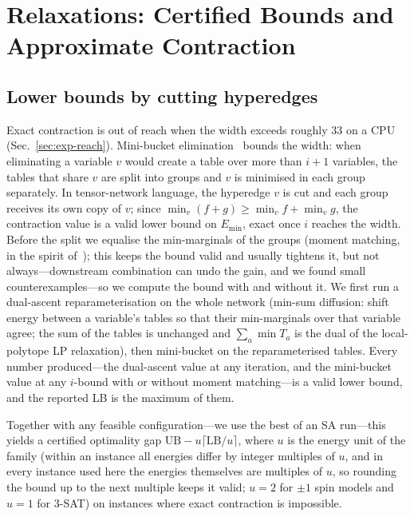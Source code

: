 \documentclass{article}
\newcommand{\Emin}{E_{\min}}
\begin{document}
\section{Relaxations: Certified Bounds and Approximate Contraction}
\label{sec:bounds}

\subsection{Lower bounds by cutting hyperedges}
Exact contraction is out of reach when the width exceeds roughly 33 on a CPU (Sec.~\ref{sec:exp-reach}). Mini-bucket elimination~\cite{dechter2003minibuckets} bounds the width: when eliminating a variable $v$ would create a table over more than $i+1$ variables, the tables that share $v$ are split into groups and $v$ is minimised in each group separately. In tensor-network language, the hyperedge $v$ is cut and each group receives its own copy of $v$; since $\min_v(f+g)\ge\min_v f+\min_v g$, the contraction value is a valid lower bound on $\Emin$, exact once $i$ reaches the width. Before the split we equalise the min-marginals of the groups (moment matching, in the spirit of~\cite{liu2011holder,ahn2019bucket}); this keeps the bound valid and usually tightens it, but not always---downstream combination can undo the gain, and we found small counterexamples---so we compute the bound with and without it. We first run a dual-ascent reparameterisation on the whole network (min-sum diffusion: shift energy between a variable's tables so that their min-marginals over that variable agree; the sum of the tables is unchanged and $\sum_a\min T_a$ is the dual of the local-polytope LP relaxation), then mini-bucket on the reparameterised tables. Every number produced---the dual-ascent value at any iteration, and the mini-bucket value at any $i$-bound with or without moment matching---is a valid lower bound, and the reported LB is the maximum of them.

Together with any feasible configuration---we use the best of an SA run---this yields a certified optimality gap $\mathrm{UB}-u\lceil\mathrm{LB}/u\rceil$, where $u$ is the energy unit of the family (within an instance all energies differ by integer multiples of $u$, and in every instance used here the energies themselves are multiples of $u$, so rounding the bound up to the next multiple keeps it valid; $u=2$ for $\pm1$ spin models and $u=1$ for 3-SAT) on instances where exact contraction is impossible.
\end{document}
